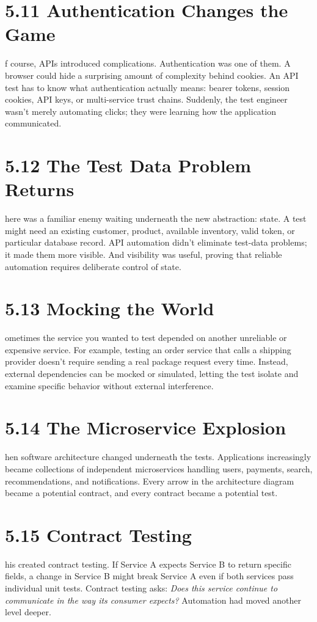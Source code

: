 \documentclass[11pt, a4paper, openany]{book}
\newcommand{\initialcap}[1]{{\fontfamily{lmss}\selectfont\huge\textbf{#1}}}
\begin{document}
\section{5.11 Authentication Changes the Game}
\noindent \initialcap{O}f course, APIs introduced complications. Authentication was one of them. A browser could hide a surprising amount of complexity behind cookies. An API test has to know what authentication actually means: bearer tokens, session cookies, API keys, or multi-service trust chains. Suddenly, the test engineer wasn't merely automating clicks; they were learning how the application communicated.

\section{5.12 The Test Data Problem Returns}
\noindent \initialcap{T}here was a familiar enemy waiting underneath the new abstraction: state. A test might need an existing customer, product, available inventory, valid token, or particular database record. API automation didn't eliminate test-data problems; it made them more visible. And visibility was useful, proving that reliable automation requires deliberate control of state.

\section{5.13 Mocking the World}
\noindent \initialcap{S}ometimes the service you wanted to test depended on another unreliable or expensive service. For example, testing an order service that calls a shipping provider doesn't require sending a real package request every time. Instead, external dependencies can be mocked or simulated, letting the test isolate and examine specific behavior without external interference.

\section{5.14 The Microservice Explosion}
\noindent \initialcap{T}hen software architecture changed underneath the tests. Applications increasingly became collections of independent microservices handling users, payments, search, recommendations, and notifications. Every arrow in the architecture diagram became a potential contract, and every contract became a potential test.

\section{5.15 Contract Testing}
\noindent \initialcap{T}his created contract testing. If Service A expects Service B to return specific fields, a change in Service B might break Service A even if both services pass individual unit tests. Contract testing asks: \textit{Does this service continue to communicate in the way its consumer expects?} Automation had moved another level deeper.
\end{document}
